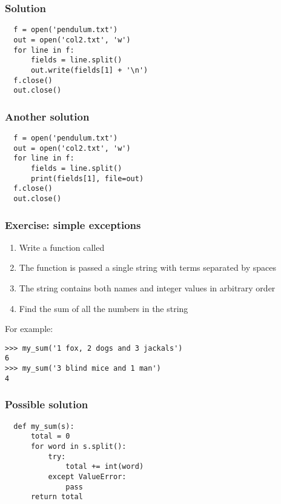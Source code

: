 \documentclass[14pt,compress]{beamer}
\begin{document}
\begin{frame}
\frametitle{Solution}
\begin{lstlisting}
  f = open('pendulum.txt')
  out = open('col2.txt', 'w')
  for line in f:
      fields = line.split()
      out.write(fields[1] + '\n')
  f.close()
  out.close()
\end{lstlisting}
\end{frame}

\begin{frame}
\frametitle{Another solution}
\begin{lstlisting}
  f = open('pendulum.txt')
  out = open('col2.txt', 'w')
  for line in f:
      fields = line.split()
      print(fields[1], file=out)
  f.close()
  out.close()
\end{lstlisting}
\end{frame}

\begin{frame}
  \frametitle{Exercise: simple exceptions}
  \begin{enumerate}
  \item Write a function called 
  \item The function is passed a single string with terms separated by spaces
  \item The string contains both names and integer values in arbitrary order
  \item Find the sum of all the numbers in the string
  \end{enumerate}
  For example:
  \begin{lstlisting}
>>> my_sum('1 fox, 2 dogs and 3 jackals')
6
>>> my_sum('3 blind mice and 1 man')
4
  \end{lstlisting}
\end{frame}

\begin{frame}
\frametitle{Possible solution}
\begin{lstlisting}
  def my_sum(s):
      total = 0
      for word in s.split():
          try:
              total += int(word)
          except ValueError:
              pass
      return total
 \end{lstlisting}
\end{frame}
\end{document}
